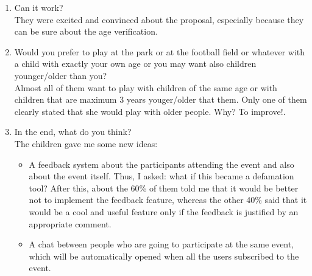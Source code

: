 \documentclass[12pt]{article}
\begin{document}
\begin{enumerate}
  \item Can it work? \\
  They were excited and convinced about the proposal, especially because they can be sure about the age verification. \\
  \item Would you prefer to play at the park or at the football field or whatever with a child with exactly your own age or you may want also children younger/older than you? \\
  Almost all of them want to play with children of the same age or with children that are maximum 3 years youger/older that them.
  Only one of them clearly stated that she would play with older people. Why? To improve!. \\
  \item In the end, what do you think? \\
  The children gave me some new ideas:
  \begin{itemize}
    \item A feedback system about the participants attending the event and also about the event itself. Thus, I asked: what if this became a defamation tool? After this, about the 60\% of them told me that it would be better not to implement the feedback feature,
    whereas the other 40\% said that it would be a cool and useful feature only if the feedback is justified by an appropriate comment.
    \item A chat between people who are going to participate at the same event, which will be automatically opened when all the users subscribed to the event.
  \end{itemize}
\end{enumerate}
\end{document}
